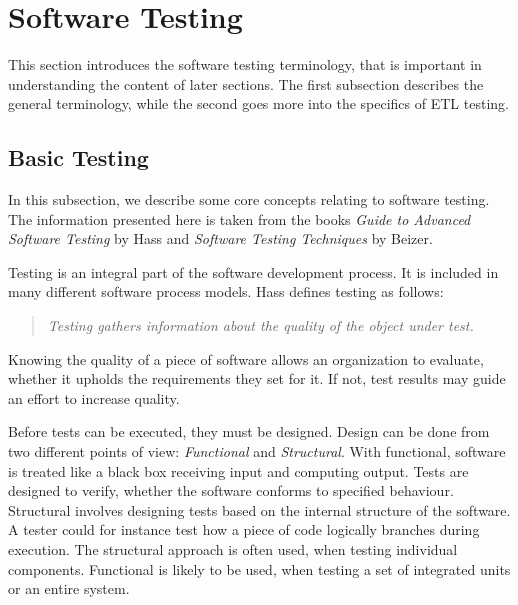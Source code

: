 \section{Software Testing}\label{sect:btesting}

This section introduces the software testing terminology, that is important in understanding the content of later sections. The first subsection describes the general terminology, while the second goes more into the specifics of ETL testing.

\subsection{Basic Testing}
In this subsection, we describe some core concepts relating to software testing. The information presented here is taken from the books \textit{Guide to Advanced Software Testing} by Hass\cite{Hass} and \textit{Software Testing Techniques} by Beizer\cite{Beizer}.

Testing is an integral part of the software development process. It is included in many different software process models. Hass defines testing as follows:
\begin{quotation} \textit{Testing gathers information about the quality of the object under test.}\end{quotation}
Knowing the quality of a piece of software allows an organization to evaluate, whether it upholds the requirements they set for it. If not, test results may guide an effort to increase quality.

Before tests can be executed, they must be designed. Design can be done from two different points of view: \emph{Functional} and \emph{Structural}. With functional, software is treated like a black box receiving input and computing output. Tests are designed to verify, whether the software conforms to specified behaviour. Structural involves designing tests based on the internal structure of the software.  A tester could for instance test how a piece of code logically branches during execution. The structural approach is often used, when testing individual components. Functional is likely to be used, when testing a set of integrated units or an entire system.

